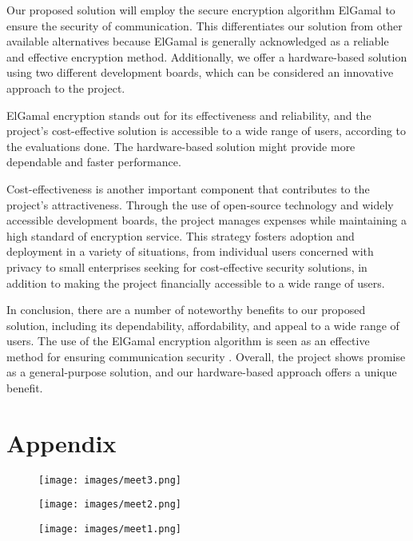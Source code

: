 \documentclass[12pt]{article}
\begin{document}
	
	Our proposed solution will employ the secure encryption algorithm ElGamal to ensure the security of communication. This differentiates our solution from other available alternatives because ElGamal is generally acknowledged as a reliable and effective encryption method\cite{mollin2001introduction}. Additionally, we offer a hardware-based solution using two different development boards, which can be considered an innovative approach to the project.
	
	ElGamal encryption stands out for its effectiveness and reliability, and the project's cost-effective solution is accessible to a wide range of users, according to the evaluations done. The hardware-based solution might provide more dependable and faster performance.
	
Cost-effectiveness is another important component that contributes to the project's attractiveness. Through the use of open-source technology and widely accessible development boards, the project manages expenses while maintaining a high standard of encryption service. This strategy fosters adoption and deployment in a variety of situations, from individual users concerned with privacy to small enterprises seeking for cost-effective security solutions, in addition to making the project financially accessible to a wide range of users.
	
In conclusion, there are a number of noteworthy benefits to our proposed solution, including its dependability, affordability, and appeal to a wide range of users. The use of the ElGamal encryption algorithm is seen as an effective method for ensuring communication security	\cite{van1999fundamentals}. Overall, the project shows promise as a general-purpose solution, and our hardware-based approach offers a unique benefit.
	\newpage



	\newpage
	\section{Appendix}
	\begin{figure}[H]
	\centering
	\label{Meeting1}
	\texttt{[image: images/meet3.png]}\\[0.5 cm]			
\end{figure}
	\begin{figure}[H]
	\centering
	\label{Meeting2}
	\texttt{[image: images/meet2.png]}\\[0.5 cm]			
\end{figure}
	\begin{figure}[H]
	\centering
	\label{Meeting3}
	\texttt{[image: images/meet1.png]}\\[0.5 cm]			
\end{figure}
	
	
\end{document}
